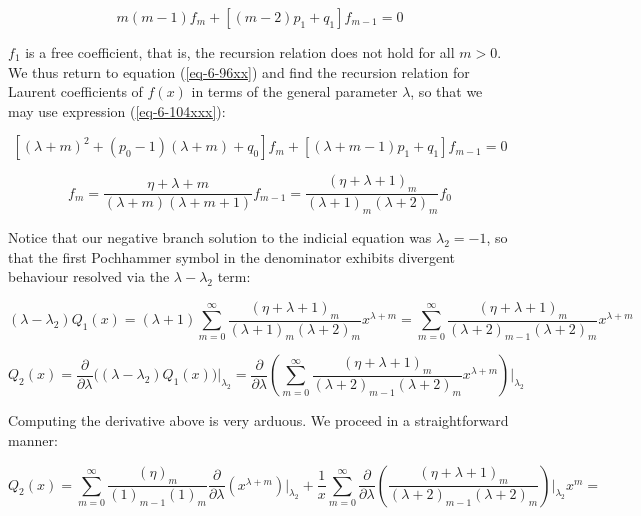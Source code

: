 \begin{equation}
    m\left(m-1\right)f_m+\left[(m-2)p_1+q_1\right]f_{m-1}=0
\end{equation}

$f_1$ is a free coefficient, that is, the recursion relation does not hold for all $m>0$. We thus return to equation (\ref{eq-6-96xx}) and find the recursion relation for Laurent coefficients of $f(x)$ in terms of the general parameter $\lambda$, so that we may use expression (\ref{eq-6-104xxx}):

\begin{equation}
    \left[(\lambda+m)^2+(p_0-1)(\lambda+m)+q_0\right]f_m+\left[(\lambda+m-1)p_1+q_1\right]f_{m-1}=0
\end{equation}

\begin{equation}
    f_m=\frac{\eta+\lambda+m}{(\lambda+m)(\lambda+m+1)}f_{m-1}=\frac{(\eta+\lambda+1)_m}{(\lambda+1)_m(\lambda+2)_m}f_0
\end{equation}

Notice that our negative branch solution to the indicial equation was $\lambda_2=-1$, so that the first Pochhammer symbol in the denominator exhibits divergent behaviour resolved via the $\lambda-\lambda_2$ term:

\begin{equation}
    (\lambda-\lambda_2)Q_1(x)=(\lambda+1)\sum_{m=0}^\infty\frac{(\eta+\lambda+1)_m}{(\lambda+1)_{m}(\lambda+2)_m}x^{\lambda+m}=\sum_{m=0}^\infty\frac{(\eta+\lambda+1)_m}{(\lambda+2)_{m-1}(\lambda+2)_m}x^{\lambda+m}
\end{equation}

\begin{equation}
    Q_2(x)=\frac{\partial}{\partial\lambda}\Big((\lambda-\lambda_2)Q_1(x)\Big)\biggr|_{\lambda_2}=\frac{\partial}{\partial\lambda}\left(\sum_{m=0}^\infty\frac{(\eta+\lambda+1)_m}{(\lambda+2)_{m-1}(\lambda+2)_m}x^{\lambda+m}\right)\biggr|_{\lambda_2}
\end{equation}

Computing the derivative above is very arduous. We proceed in a straightforward manner:

\begin{equation*}
    Q_2(x)=\sum_{m=0}^\infty\frac{(\eta)_m}{(1)_{m-1}(1)_m}\frac{\partial}{\partial\lambda}\left(x^{\lambda+m}\right)\biggr|_{\lambda_2}+\frac{1}{x}\sum_{m=0}^\infty\frac{\partial}{\partial\lambda}\left(\frac{(\eta+\lambda+1)_m}{(\lambda+2)_{m-1}(\lambda+2)_m}\right)\biggr|_{\lambda_2}x^m=
\end{equation*}


